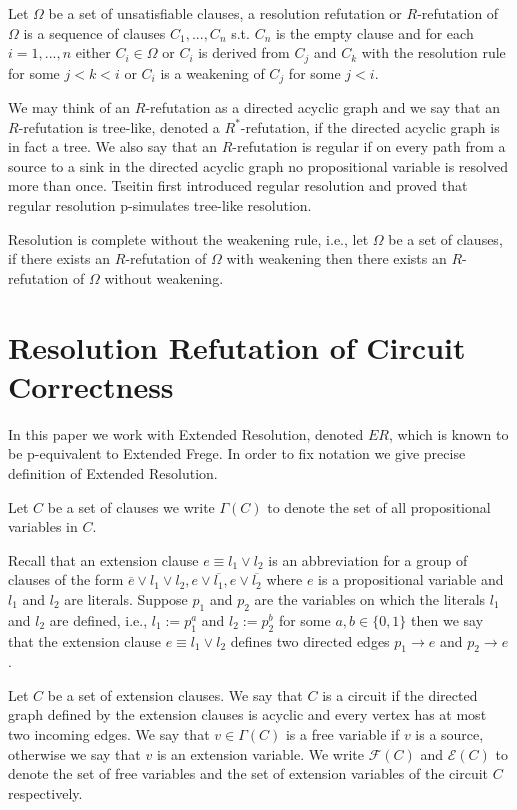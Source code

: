 \documentclass{LMCS}
\theoremstyle{plain}\newtheorem{satz}[thm]{Satz}
\begin{document}
Let $\Omega$ be a set of unsatisfiable clauses, a resolution refutation or $R$-refutation of $\Omega$ is a sequence of clauses $C_1,...,C_n$ s.t. $C_n$ is the empty clause and for each $i = 1,...,n$ either $C_i \in \Omega$ or $C_i$ is derived from $C_j$ and $C_k$ with the resolution rule for some $j<k<i$ or $C_i$ is a weakening of $C_j$ for some $j<i$.

We may think of an $R$-refutation as a directed acyclic graph and we say that an $R$-refutation is tree-like, denoted a $R^*$-refutation, if the directed acyclic graph is in fact a tree. We also say that an $R$-refutation is regular if on every path from a source to a sink in the directed acyclic graph no propositional variable is resolved more than once. Tseitin \cite{0205.00402} first introduced regular resolution and proved that regular resolution p-simulates tree-like resolution.

Resolution is complete without the weakening rule, i.e., let $\Omega$ be a set of clauses, if there exists an $R$-refutation of $\Omega$ with weakening then there exists an $R$-refutation of $\Omega$ without weakening.

\section{Resolution Refutation of Circuit Correctness}
\label{s_circuit}

In this paper we work with Extended Resolution, denoted $ER$, which is known to be p-equivalent to Extended Frege. In order to fix notation we give precise definition of Extended Resolution.

\begin{defi}
Let $C$ be a set of clauses we write $\Gamma(C)$ to denote the set of all propositional variables in $C$.
\end{defi}

Recall that an extension clause $e \equiv l_1 \lor l_2$ is an abbreviation for a group of clauses of the form $\overline{e} \lor l_1 \lor l_2, e \lor \overline{l_1}, e \lor \overline{l_2}$ where $e$ is a propositional variable and $l_1$ and $l_2$ are literals. Suppose $p_1$ and $p_2$ are the variables on which the literals $l_1$ and $l_2$ are defined, i.e., $l_1 := p_1^a$ and $l_2 := p_2^b$ for some $a,b \in \{0,1\}$ then we say that the extension clause $e \equiv l_1 \lor l_2$ defines two directed edges $p_1 \longrightarrow e$ and $p_2 \longrightarrow e$.

\begin{defi}
Let $C$ be a set of extension clauses. We say that $C$ is a circuit if the directed graph defined by the extension clauses is acyclic and every vertex has at most two incoming edges. We say that $v \in \Gamma(C)$ is a free variable if $v$ is a source, otherwise we say that $v$ is an extension variable. We write ${\mathcal F}(C)$ and ${\mathcal E}(C)$ to denote the set of free variables and the set of extension variables of the circuit $C$ respectively.
\end{defi}
\end{document}
